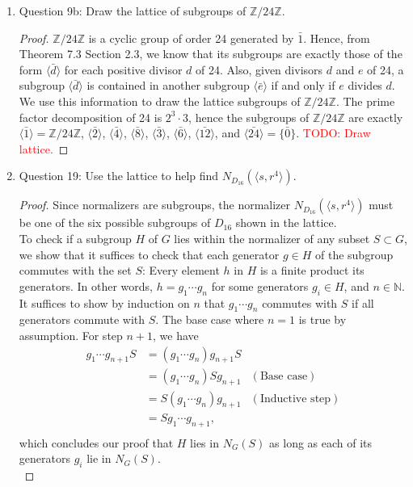 \documentclass{article}
\newcommand{\TODO}[1]{\textcolor{red}{TODO: #1}}
\begin{document}
\begin{enumerate}
\begin{enumerate}
      \item Question 9b: Draw the lattice of subgroups of
        $\mathbb{Z}/24\mathbb{Z}$.
        \begin{proof}
          $\mathbb{Z}/24\mathbb{Z}$ is a cyclic group of order 24 generated
          by $\bar{1}$. Hence, from Theorem 7.3 Section 2.3, we know that
          its subgroups are exactly those of the form
          $\langle\bar{d}\rangle$ for each positive divisor $d$ of 24. Also,
          given divisors $d$ and $e$ of 24, a subgroup
          $\langle\bar{d}\rangle$ is contained in another subgroup
          $\langle\bar{e}\rangle$ if and only if $e$ divides $d$. We use
          this information to draw the lattice subgroups of
          $\mathbb{Z}/24\mathbb{Z}$. The prime factor decomposition of 24
          is $2^3\cdot3$, hence the subgroups of $\mathbb{Z}/24\mathbb{Z}$
          are exactly $\langle\bar{1}\rangle=\mathbb{Z}/24\mathbb{Z}$,
          $\langle\bar{2}\rangle$, $\langle\bar{4}\rangle$,
          $\langle\bar{8}\rangle$, $\langle\bar{3}\rangle$,
          $\langle\bar{6}\rangle$, $\langle\bar{12}\rangle$, and
          $\langle\bar{24}\rangle=\{\bar{0}\}$.
          \TODO{Draw lattice.}
        \end{proof}

      \item Question 19: Use the lattice to help find $N_{D_{16}}(\langle
        s,r^4\rangle)$.
        \begin{proof}
          Since normalizers are subgroups, the normalizer
          $N_{D_{16}}(\langle s,r^4\rangle)$ must be one of the six
          possible subgroups of $D_{16}$ shown in the lattice. \\

          To check if
          a subgroup $H$ of $G$ lies within the normalizer of any subset
          $S\subset G$, we show that it suffices to check that each
          generator $g\in H$ of the subgroup commutes with the set $S$:
          Every element $h$ in $H$ is a finite product its generators.
          In other words, $h=g_1\cdots g_n$ for some generators
          $g_i\in H$, and $n\in\mathbb{N}$. It suffices to show by
          induction on $n$ that $g_1\cdots g_n$ commutes with $S$ if all
          generators commute with $S$. The base case where $n=1$ is true by
          assumption. For step $n+1$, we have
          \begin{align*}
            g_1\cdots g_{n+1}S  &= (g_1\cdots g_n)g_{n+1}S  & \\
                                &= (g_1\cdots g_n)Sg_{n+1}  & (\text{Base
                                case}) \\
                                &= S(g_1\cdots g_n)g_{n+1}  &
                                (\text{Inductive step}) \\
                                &= Sg_1\cdots g_{n+1},      & \\
          \end{align*}
          which concludes our proof that $H$ lies in $N_G(S)$ as long as
          each of its generators $g_i$ lie in $N_G(S)$. \\


\end{proof}
\end{enumerate}
\end{enumerate}
\end{document}
